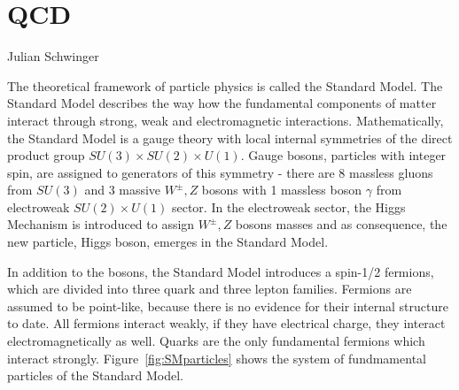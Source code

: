 \chapter{QCD}
\label{ch:qcd}

{Julian Schwinger}

The theoretical framework of particle physics is called the Standard Model. The
Standard Model describes the way how the fundamental components of matter
interact through strong, weak and electromagnetic interactions.
Mathematically, the
Standard Model is a gauge theory with local internal symmetries of
the direct product group $SU(3) \times SU(2) \times U(1)$. 
Gauge bosons, particles with integer spin, are assigned to generators of this
symmetry - there are 8 massless gluons from $SU(3)$ and 3 massive $W^\pm, Z$
bosons with 1 massless boson $\gamma$ from electroweak $SU(2) \times U(1)$
sector. 
In the electroweak sector, the Higgs Mechanism is introduced to assign $W^\pm, Z$
bosons masses and as consequence, the new particle, Higgs boson, emerges in the
Standard Model. 

In addition to the bosons, the Standard Model introduces a spin-1/2 fermions,
which are divided into three quark and three lepton families. 
Fermions are assumed to be point-like, because there is no evidence for their
internal structure to date.
All fermions interact weakly, if they have electrical charge, they interact
electromagnetically as well. Quarks are the only fundamental fermions which
interact strongly. 
Figure~\ref{fig:SMparticles} shows the system of fundmamental particles of the
Standard Model.

